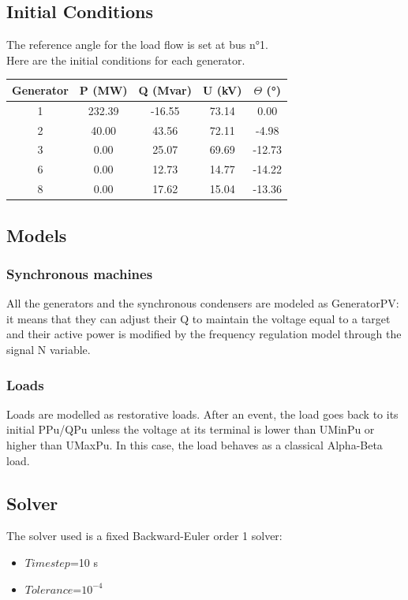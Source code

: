\documentclass[a4paper, 12pt]{report}
\begin{document}
\subsection{Initial Conditions}

The reference angle for the load flow is set at bus n°1. \\

Here are the initial conditions for each generator.

\begin{center}
\begin{tabular}{|c|c|c|c|c|}
  \hline
  Generator & P (MW) & Q (Mvar) & U (kV) & $\Theta$ (°) \\
  \hline
  1 & 232.39 & -16.55 & 73.14 & 0.00\\
  2 & 40.00 & 43.56 & 72.11 & -4.98\\
  3 & 0.00 & 25.07 & 69.69 & -12.73\\
  6 & 0.00 & 12.73 & 14.77 & -14.22\\
  8 & 0.00 & 17.62 & 15.04 & -13.36\\
  \hline
\end{tabular}
\end{center}

\subsection{Models}

\subsubsection{Synchronous machines}

All the generators and the synchronous condensers are modeled as GeneratorPV: it means that they can adjust their Q to maintain the voltage equal to a target and their active power is modified by the frequency regulation model through the signal N variable.

\subsubsection{Loads}

Loads are modelled as restorative loads. After an event, the load goes back to its initial PPu/QPu unless the voltage at its terminal is lower than UMinPu or higher than UMaxPu. In this case, the load behaves as a classical Alpha-Beta load.

\subsection{Solver}
The solver used is a fixed Backward-Euler order 1 solver:
\begin{itemize}
\item $Time step$=10 s
\item $Tolerance$=$10^{-4}$
\end{itemize}
\end{document}
